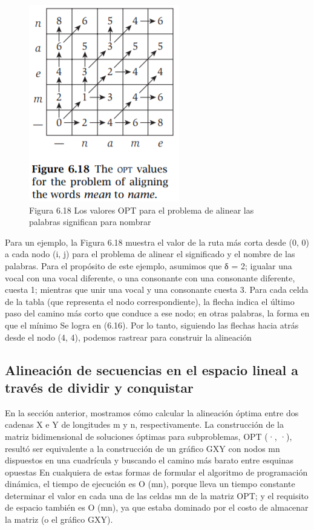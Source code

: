 \documentclass[a4paper]{article}
\begin{document}
\begin{figure}[h]
\centering
\includegraphics[scale=1]{Imagenes-Seccion6/fig6_18.PNG}
\caption{Figura 6.18 Los valores OPT para el problema de alinear las palabras significan para nombrar}
\end{figure}

Para un ejemplo, la Figura 6.18 muestra el valor de la ruta más corta desde (0, 0) a cada nodo (i, j) para el problema de alinear el significado y el nombre de las palabras. Para el propósito de este ejemplo, asumimos que δ = 2; igualar una vocal con una vocal diferente, o una consonante con una consonante diferente, cuesta 1; mientras que unir una vocal y una consonante cuesta 3. Para cada celda de la tabla (que representa el nodo correspondiente), la flecha indica el último paso del camino más corto que conduce a ese nodo; en otras palabras, la forma en que el mínimo Se logra en (6.16). Por lo tanto, siguiendo las flechas hacia atrás desde el nodo (4, 4), podemos rastrear para construir la alineación\\

\subsection{Alineación de secuencias en el espacio lineal a través de dividir y conquistar}

En la sección anterior, mostramos cómo calcular la alineación óptima entre dos cadenas X e Y de longitudes m y n, respectivamente. La construcción de la matriz bidimensional de soluciones óptimas para subproblemas, OPT (·, ·), resultó ser equivalente a la construcción de un gráfico GXY con nodos mn dispuestos en una cuadrícula y buscando el camino más barato entre esquinas opuestas En cualquiera de estas formas de formular el algoritmo de programación dinámica, el tiempo de ejecución es O (mn), porque lleva un tiempo constante determinar el valor en cada una de las celdas mn de la matriz OPT; y el requisito de espacio también es O (mn), ya que estaba dominado por el costo de almacenar la matriz (o el gráfico GXY).\\
\end{document}
